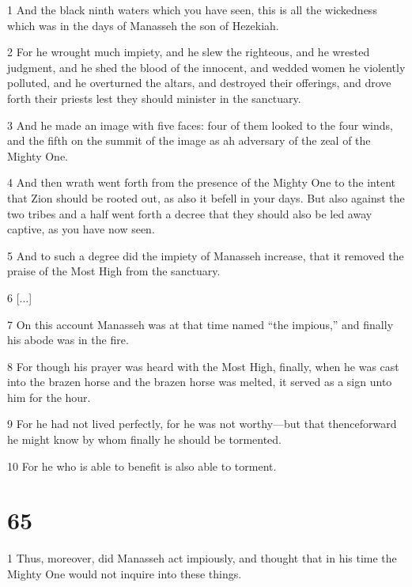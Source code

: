 \par 1 And the black ninth waters which you have seen, this is all the wickedness which was in the days of Manasseh the son of Hezekiah. 

\par 2 For he wrought much impiety, and he slew the righteous, and he wrested judgment, and he shed the blood of the innocent, and wedded women he violently polluted, and he overturned the altars, and destroyed their offerings, and drove forth their priests lest they should minister in the sanctuary. 

\par 3 And he made an image with five faces: four of them looked to the four winds, and the fifth on the summit of the image as ah adversary of the zeal of the Mighty One. 

\par 4 And then wrath went forth from the presence of the Mighty One to the intent that Zion should be rooted out, as also it befell in your days. But also against the two tribes and a half went forth a decree that they should also be led away captive, as you have now seen. 

\par 5 And to such a degree did the impiety of Manasseh increase, that it removed the praise of the Most High from the sanctuary. 

\par 6 [...]

\par 7 On this account Manasseh was at that time named “the impious,” and finally his abode was in the fire. 

\par 8 For though his prayer was heard with the Most High, finally, when he was cast into the brazen horse and the brazen horse was melted, it served as a sign unto him for the hour. 

\par 9 For he had not lived perfectly, for he was not worthy—but that thenceforward he might know by whom finally he should be tormented. 

\par 10 For he who is able to benefit is also able to torment.

\chapter{65}

\par 1 Thus, moreover, did Manasseh act impiously, and thought that in his time the Mighty One would not inquire into these things. 

